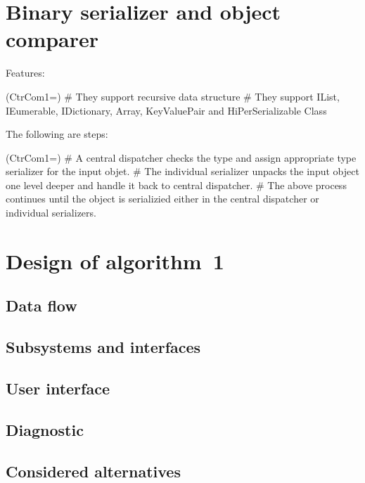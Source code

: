 \section{Binary serializer and object comparer}
Features: 
\begin{listb}
\ListProperties(CtrCom1=\counter{})
# They support recursive data structure
# They support IList, IEumerable, IDictionary, Array, KeyValuePair and HiPerSerializable Class
\end{listb}
\vspace{0.1cm}
\noindent The following are steps:
\begin{listb}
\ListProperties(CtrCom1=)
# A central dispatcher checks the type and assign appropriate type serializer for the input objet.
# The individual serializer unpacks the input object one level deeper and handle it back to central dispatcher.
# The above process continues until the object is serializied either in the central dispatcher or individual serializers. 
\end{listb}

\section{Design of algorithm~1}
\subsection{Data flow}
\subsection{Subsystems and interfaces}
\subsection{User interface}
\subsection{Diagnostic}
\subsection{Considered alternatives}


